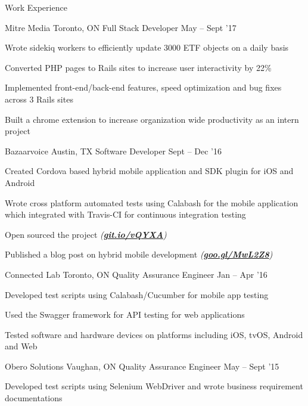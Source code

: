 \documentclass{resume} %
\begin{document}
	\begin{rSection}{Work Experience}
		
		
		
		\begin{rSubsection}{Mitre Media}
			{Toronto, ON}
			{Full Stack Developer}
			{May -- Sept '17}
			
			\item Wrote sidekiq workers to efficiently update 3000 ETF objects on a daily basis
			\item Converted PHP pages to Rails sites to increase user interactivity by 22\%
			\item Implemented front-end/back-end features, speed optimization and bug fixes across 3 Rails sites
			\item Built a chrome extension to increase organization wide productivity as an intern project
		\end{rSubsection}
		
		\begin{rSubsection}{Bazaarvoice}
			{Austin, TX}
			{Software Developer}
			{Sept -- Dec '16}
			
			\item Created Cordova based hybrid mobile application and SDK plugin for iOS and Android
			\item Wrote cross platform automated tests using Calabash for the mobile application which integrated with Travis-CI for continuous integration testing
			\item Open sourced the project {\em (\href{https://git.io/vQYXA}{\textbf{git.io/vQYXA}})} 
			\item Published a blog post on hybrid mobile development {\em (\href{https://goo.gl/MwL2Z8}{\textbf{goo.gl/MwL2Z8}})} 
		\end{rSubsection}
		
		\begin{rSubsection}{Connected Lab}
			{Toronto, ON}
			{Quality Assurance Engineer}
			{Jan -- Apr '16}
			
			\item Developed test scripts using Calabash/Cucumber for mobile app testing
			\item Used the Swagger framework for API testing for web applications
			\item Tested software and hardware devices on platforms including iOS, tvOS, Android and Web
		\end{rSubsection}
		
		\begin{rSubsection}{Obero Solutions}
			{Vaughan, ON}
			{Quality Assurance Engineer}
			{May -- Sept '15}
			
			\item Developed test scripts using Selenium WebDriver and wrote business requirement documentations
			
		\end{rSubsection}
	\end{rSection}
	
\end{document}
